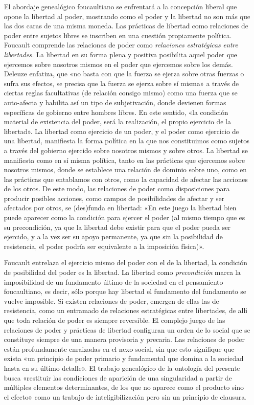 El abordaje genealógico foucaultiano se enfrentará a la concepción liberal que opone la libertad al poder, mostrando como el poder y la libertad no son más que las dos caras de una misma moneda. Las prácticas de libertad como relaciones de poder entre sujetos libres se inscriben en una cuestión propiamente política. Foucault comprende las relaciones de poder como \emph{relaciones estratégicas entre libertades.} La libertad en su forma plena y positiva posibilita aquel poder que ejercemos sobre nosotros mismos en el poder que ejercemos sobre los demás. Deleuze enfatiza, que «no basta con que la fuerza se ejerza sobre otras fuerzas o sufra sus efectos, se precisa que la fuerza se ejerza sobre sí misma» a través de ciertas reglas facultativas (de relación consigo mismo) como una fuerza que se auto-afecta y habilita así un tipo de subjetivación, donde devienen formas específicas de gobierno entre hombres libres. En este sentido, «la condición material de existencia del poder, será la realización, el propio ejercicio de la libertad». La libertad como ejercicio de un poder, y el poder como ejercicio de una libertad, manifiesta la forma política en la que nos constituimos como sujetos a través del gobierno ejercido sobre nosotros mismos y sobre otros. La libertad se manifiesta como en sí misma política, tanto en las prácticas que ejercemos sobre nosotros mismos, donde se establece una relación de dominio sobre uno, como en las prácticas que entablamos con otros, como la capacidad de afectar las acciones de los otros. De este modo, las relaciones de poder como disposiciones para producir posibles acciones, como campos de posibilidades de afectar y ser afectados por otros, se (des)funda en libertad: «En este juego la libertad bien puede aparecer como la condición para ejercer el poder (al mismo tiempo que es su precondición, ya que la libertad debe existir para que el poder pueda ser ejercido, y a la vez ser su apoyo permanente, ya que sin la posibilidad de resistencia, el poder podría ser equivalente a la imposición física)».

Foucault entrelaza el ejercicio mismo del poder con el de la libertad, la condición de posibilidad del poder es la libertad. La libertad como \emph{precondición} marca la imposibilidad de un fundamento último de la sociedad en el pensamiento foucaultiano, es decir, sólo porque hay libertad el fundamento del fundamento se vuelve imposible. Si existen relaciones de poder, emergen de ellas las de resistencia, como un entramado de relaciones estratégicas entre libertades, de allí que toda relación de poder es siempre reversible. El complejo juego de las relaciones de poder y prácticas de libertad configuran un orden de lo social que se constituye siempre de una manera provisoria y precaria. Las relaciones de poder están profundamente enraizadas en el nexo social, sin que esto signifique que exista «un principio de poder primario y fundamental que domina a la sociedad hasta en su último detalle». El trabajo genealógico de la ontología del presente busca «restituir las condiciones de aparición de una singularidad a partir de múltiples elementos determinantes, de los que no aparece como el producto sino el efecto» como un trabajo de inteligibilización pero sin un principio de clausura.

